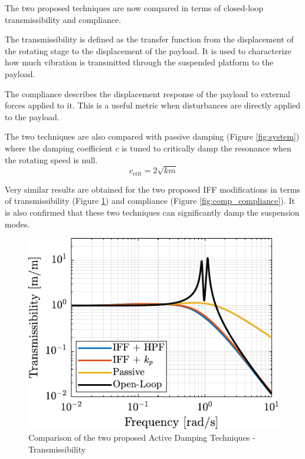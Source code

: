 \documentclass[Afour,sagev,times]{sagej}
\begin{document}
\par
The two proposed techniques are now compared in terms of closed-loop transmissibility and compliance.

The transmissibility is defined as the transfer function from the displacement of the rotating stage to the displacement of the payload.
It is used to characterize how much vibration is transmitted through the suspended platform to the payload.

The compliance describes the displacement response of the payload to external forces applied to it.
This is a useful metric when disturbances are directly applied to the payload.

The two techniques are also compared with passive damping (Figure \ref{fig:system}) where the damping coefficient \(c\) is tuned to critically damp the resonance when the rotating speed is null.
\begin{equation}
  c_\text{crit} = 2 \sqrt{k m}
\end{equation}

Very similar results are obtained for the two proposed IFF modifications in terms of transmissibility (Figure \ref{fig:comp_transmissibility}) and compliance (Figure \ref{fig:comp_compliance}).
It is also confirmed that these two techniques can significantly damp the suspension modes.

\begin{figure}[htbp]
\centering
\includegraphics[scale=1]{figs/comp_transmissibility.pdf}
\caption{\label{fig:comp_transmissibility}Comparison of the two proposed Active Damping Techniques - Transmissibility}
\end{figure}
\end{document}
